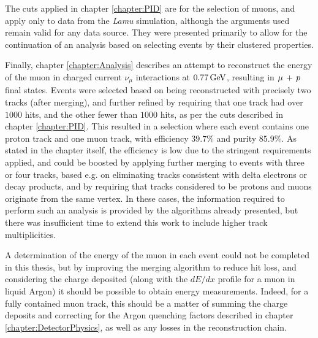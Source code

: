 The cuts applied in chapter \ref{chapter:PID} are for the selection of muons, and apply only to data from the \emph{Lamu} simulation, although the arguments used remain valid for any data source. They were presented primarily to allow for the continuation of an analysis based on selecting events by their clustered properties.

Finally, chapter \ref{chapter:Analysis} describes an attempt to reconstruct the energy of the muon in charged current $\nu_\mu$ interactions at $0.77\,\mathrm{GeV}$, resulting in $\mu\,+\,p$ final states. Events were selected based on being reconstructed with precisely two tracks (after merging), and further refined by requiring that one track had over $1000$ hits, and the other fewer than $1000$ hits, as per the cuts described in chapter \ref{chapter:PID}. This resulted in a selection where each event contains one proton track and one muon track, with efficiency $39.7\%$ and purity $85.9\%$. As stated in the chapter itself, the efficiency is low due to the stringent requirements applied, and could be boosted by applying further merging to events with three or four tracks, based e.g. on eliminating tracks consistent with delta electrons or decay products, and by requiring that tracks considered to be protons and muons originate from the same vertex. In these cases, the information required to perform such an analysis is provided by the algorithms already presented, but there was insufficient time to extend this work to include higher track multiplicities.

A determination of the energy of the muon in each event could not be completed in this thesis, but by improving the merging algorithm to reduce hit loss, and considering the charge deposited (along with the $dE/dx$ profile for a muon in liquid Argon) it should be possible to obtain energy measurements. Indeed, for a fully contained muon track, this should be a matter of summing the charge deposits and correcting for the Argon quenching factors described in chapter \ref{chapter:DetectorPhysics}, as well as any losses in the reconstruction chain.

